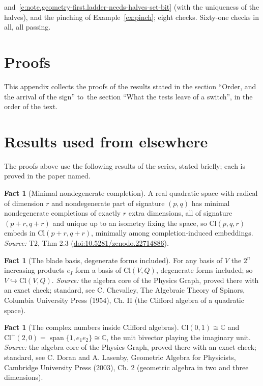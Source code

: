 \documentclass[11pt]{article}
\theoremstyle{definition}
\newtheorem{fact}[theorem]{Fact}
\theoremstyle{plain}
\providecommand{\C}{}\renewcommand{\C}{\mathbb{C}}
\providecommand{\Cl}{}\renewcommand{\Cl}{\mathrm{Cl}}
\begin{document}
and~\ref{c:note.geometry-first.ladder-needs-halves-set-bit} (with the uniqueness of the halves), and the pinching of Example~\ref{ex:pinch}; eight checks. Sixty-one checks in all, all passing.

\section{Proofs}

\label{c:note.geometry-first.setting-proofs}
This appendix collects the proofs of the results stated in the section ``Order, and the arrival of the sign'' to~the section ``What the tests leave of a switch'', in the order of the text.

\section{Results used from elsewhere}
The proofs above use the following results of the series, stated briefly; each is proved in the paper named.

\begin{fact}[Minimal nondegenerate completion]\label{c:conformal.minimal-nondegenerate-completion}
A real quadratic space with radical of dimension $r$ and nondegenerate part of signature $(p,q)$ has minimal nondegenerate completions of exactly $r$ extra dimensions, all of signature $(p+r,q+r)$ and unique up to an isometry fixing the space, so $\Cl(p,q,r)$ embeds in $\Cl(p+r,q+r)$, minimally among completion-induced embeddings.
\emph{Source:} T2, Thm 2.3 (\href{https://doi.org/10.5281/zenodo.22714886}{doi:10.5281/zenodo.22714886}).
\end{fact}

\begin{fact}[The blade basis, degenerate forms included]\label{c:std-algebra.blade-basis}
For any basis of $V$ the $2^{n}$ increasing products $e_I$ form a basis of $\Cl(V, Q)$, degenerate forms included; so $V \hookrightarrow \Cl(V, Q)$.
\emph{Source:} the algebra core of the Physics Graph, proved there with an exact check; standard, see C. Chevalley, The Algebraic Theory of Spinors, Columbia University Press (1954), Ch. II (the Clifford algebra of a quadratic space).
\end{fact}

\begin{fact}[The complex numbers inside Clifford algebras]\label{c:std-algebra.complex-numbers}
$\Cl(0,1) \cong \C$ and $\Cl^{+}(2,0) = \operatorname{span}\{1, e_1 e_2\} \cong \C$, the unit bivector playing the imaginary unit.
\emph{Source:} the algebra core of the Physics Graph, proved there with an exact check; standard, see C. Doran and A. Lasenby, Geometric Algebra for Physicists, Cambridge University Press (2003), Ch. 2 (geometric algebra in two and three dimensions).
\end{fact}
\end{document}
